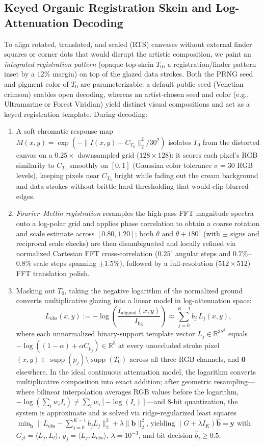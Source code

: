 \documentclass[]{interact}
\theoremstyle{plain}
\theoremstyle{definition}
\theoremstyle{remark}
\begin{document}
\subsection{Keyed Organic Registration Skein and Log-Attenuation Decoding}
To align rotated, translated, and scaled (RTS) canvases without external finder squares or corner dots that would disrupt the artistic composition, we paint an \emph{integrated registration pattern} (opaque top-skein $T_0$, a registration/finder pattern inset by a $12\%$ margin) on top of the glazed data strokes. Both the PRNG seed and pigment color of $T_0$ are parameterizable: a default public seed (Venetian crimson) enables open decoding, whereas an artist-chosen seed and color (e.g., Ultramarine or Forest Viridian) yield distinct visual compositions and act as a keyed registration template. During decoding:
\begin{enumerate}
  \item A soft chromatic response map $M(x,y) = \exp(-\|I(x,y) - C_{T_0}\|_2^2 / 30^2)$ isolates $T_0$ from the distorted canvas on a $0.25\times$ downsampled grid ($128 \times 128$): it scores each pixel's RGB similarity to $C_{T_0}$ smoothly on $[0, 1]$ (Gaussian color tolerance $\sigma = 30$ RGB levels), keeping pixels near $C_{T_0}$ bright while fading out the cream background and data strokes without brittle hard thresholding that would clip blurred edges.
  \item \emph{Fourier--Mellin registration} \citep{reddy1996fft,oruanaidh1997rotation} resamples the high-pass FFT magnitude spectra onto a log-polar grid and applies phase correlation to obtain a coarse rotation and scale estimate across $[0.80, 1.20]$; both $\theta$ and $\theta + 180^\circ$ (with $\pm$ signs and reciprocal scale checks) are then disambiguated and locally refined via normalized Cartesian FFT cross-correlation ($0.25^\circ$ angular steps and $0.7\%$--$0.8\%$ scale steps spanning $\pm 1.5\%$), followed by a full-resolution ($512 \times 512$) FFT translation polish.
  \item Masking out $T_0$, taking the negative logarithm of the normalized ground converts multiplicative glazing into a linear model in log-attenuation space:
  \[
    L_{\mathrm{obs}}(x,y) := -\log\!\left(\frac{I_{\mathrm{aligned}}(x,y)}{I_{\mathrm{bg}}}\right) \approx \sum_{j=0}^{K-1} b_j\, L_j(x,y),
  \]
  where each unnormalized binary-support template vector $L_j \in \mathbb{R}^{3S^2}$ equals $-\log((1-\alpha) + \alpha C_{p_j}) \in \mathbb{R}^3$ at every unoccluded stroke pixel $(x,y) \in \operatorname{supp}(p_j) \setminus \operatorname{supp}(T_0)$ across all three RGB channels, and $\mathbf{0}$ elsewhere. In the ideal continuous attenuation model, the logarithm converts multiplicative composition into exact addition; after geometric resampling—where bilinear interpolation averages RGB values before the logarithm, $-\log(\sum_i w_i I_i) \neq \sum_i w_i [-\log(I_i)]$—and 8-bit quantization, the system is approximate and is solved via ridge-regularized least squares $\min_{\mathbf{b}} \|L_{\mathrm{obs}} - \sum_{j=0}^{K-1} b_j L_j\|_2^2 + \lambda \|\mathbf{b}\|_2^2$, yielding $(G + \lambda I_K)\hat{\mathbf{b}} = \mathbf{y}$ with $G_{jl} = \langle L_j, L_l \rangle$, $y_j = \langle L_j, L_{\mathrm{obs}} \rangle$, $\lambda = 10^{-3}$, and bit decision $\hat{b}_j \ge 0.5$.

\end{enumerate}
\end{document}
